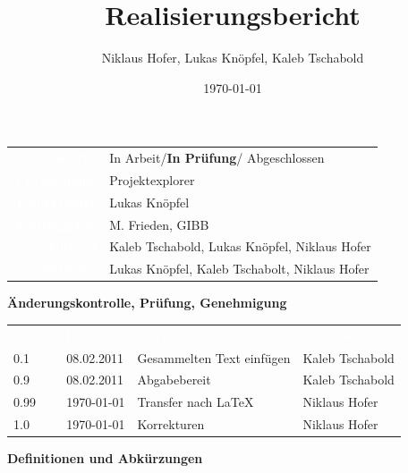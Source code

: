 \documentclass[10pt,paper=a4,final]{scrartcl}
\title{Realisierungsbericht}
\author{Niklaus Hofer, Lukas Kn\"opfel, Kaleb Tschabold}
\date{\today}
\begin{document}
\maketitle
\newpage
\begin{tabularx}{\textwidth}{ r X }	%
  \textcolor{white}{{\bf Status}}\cellcolor{blue!80!} & In Arbeit/{\bf In Prüfung}/ Abgeschlossen\cellcolor{blue!20!} \\
\textcolor{white}{{\bf Projektname}}\cellcolor{blue!80!} & Projektexplorer\cellcolor{blue!20!} \\
\textcolor{white}{{\bf Projektleiter}}\cellcolor{blue!80!} & Lukas Kn\"opfel\cellcolor{blue!20!} \\
\textcolor{white}{{\bf Auftraggeber}}\cellcolor{blue!80!} & M. Frieden, GIBB\cellcolor{blue!20!} \\
\textcolor{white}{{\bf Autoren}}\cellcolor{blue!80!} & Kaleb Tschabold, Lukas Kn\"opfel, Niklaus Hofer\cellcolor{blue!20!} \\
\textcolor{white}{{\bf Verteiler}}\cellcolor{blue!80!} & Lukas Knöpfel, Kaleb Tschabolt, Niklaus Hofer\cellcolor{blue!20!}
\end{tabularx}
\newline
\newline
\newline
{\bf Änderungskontrolle, Prüfung, Genehmigung}
\newline

\begin{tabularx}{\textwidth}{l l X X}
\textcolor{white}{Version}\cellcolor{blue!80!} & \textcolor{white}{Datum}\cellcolor{blue!80!} & \textcolor{white}{Beschreibung, Bemerkung}\cellcolor{blue!80!} & \textcolor{white}{Name oder Rolle}\cellcolor{blue!80!} \\
\cellcolor{blue!20!} 0.1& \cellcolor{blue!20!} 08.02.2011 & Gesammelten Text einfügen \cellcolor{blue!20!} & Kaleb Tschabold \cellcolor{blue!20!} \\
\cellcolor{blue!20!} 0.9& \cellcolor{blue!20!} 08.02.2011 & Abgabebereit \cellcolor{blue!20!} & Kaleb Tschabold \cellcolor{blue!20!} \\
\cellcolor{blue!20!} 0.99& \cellcolor{blue!20!} \today{} & Transfer nach \LaTeX \cellcolor{blue!20!} & Niklaus Hofer \cellcolor{blue!20!} \\
\cellcolor{blue!20!} 1.0& \cellcolor{blue!20!} \today{} & Korrekturen \cellcolor{blue!20!} & Niklaus Hofer \cellcolor{blue!20!} \\
\end{tabularx}
\newline
\newline
\newline
{\bf Definitionen und Abkürzungen}
\newline
\end{document}
